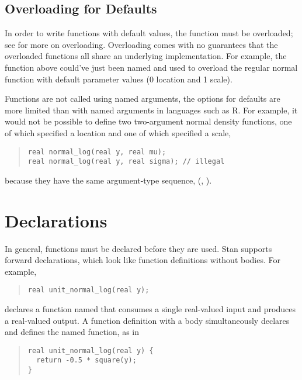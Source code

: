 \subsection{Overloading for Defaults}

In order to write functions with default values, the function must be
overloaded; see  for more on
overloading.  Overloading comes with no guarantees that the overloaded
functions all share an underlying implementation.   For example, the function
 above could've just been named
 and used to overload the regular normal function
with default parameter values (0 location and 1 scale).

Functions are not called using named arguments, the options for
defaults are more limited than with named arguments in languages such
as R.  For example, it would not be possible to define two
two-argument normal density functions, one of which specified a
location and one of which specified a scale, 
%
\begin{quote}
\begin{Verbatim}
real normal_log(real y, real mu);
real normal_log(real y, real sigma); // illegal 
\end{Verbatim}
\end{quote}
%
because they have the same argument-type sequence, (,
).


\section{Declarations}\label{forward-declarations.section}

In general, functions must be declared before they are used.  Stan
supports forward declarations, which look like function definitions
without bodies.  For example,
%
\begin{quote}
\begin{Verbatim}
real unit_normal_log(real y); 
\end{Verbatim}
\end{quote}
%
declares a function named  that consumes a
single real-valued input and produces a real-valued output.  A
function definition with a body simultaneously declares and defines
the named function, as in
%
\begin{quote}
\begin{Verbatim}
real unit_normal_log(real y) {
  return -0.5 * square(y);
}
\end{Verbatim}
\end{quote}
%

